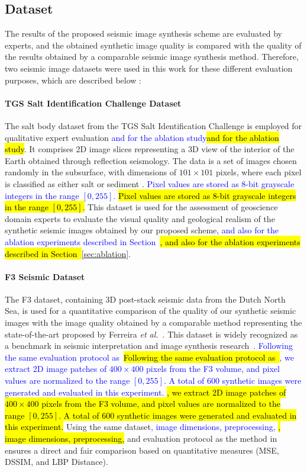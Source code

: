 \documentclass{ieeeaccess}
\providecommand{\DIFaddbegin}{} %
\providecommand{\DIFaddend}{} %
\newcommand{\DIFaddincludegraphics}[2][]{{\color{blue}\fbox{\DIFOincludegraphics[#1]{#2}}}} %
\DeclareRobustCommand{\DIFaddbegin}{\DIFOaddbegin \let\includegraphics\DIFaddincludegraphics} %
\DeclareRobustCommand{\DIFaddend}{\DIFOaddend \let\includegraphics\DIFOincludegraphics} %
\providecommand{\DIFadd}[1]{\ifmmode\textcolor{blue}{#1}\else\hl{#1}\fi}
\renewcommand{\DIFadd}[1]{\ifmmode\textcolor{blue}{#1}\else\hl{#1}\fi}
\begin{document}
\subsection{Dataset}

The results of the proposed seismic image synthesis scheme are evaluated by experts, and the obtained synthetic image quality is compared with the quality of the results obtained by a comparable seismic image synthesis method. Therefore, two seismic image datasets were used in this work for these different evaluation purposes, which are described below :

\paragraph{TGS Salt Identification Challenge Dataset}

The salt body dataset from the TGS Salt Identification Challenge is employed for qualitative expert evaluation \DIFaddbegin \DIFadd{and for the ablation study}\DIFaddend . It comprises 2D image slices representing a 3D view of the interior of the Earth obtained through reflection seismology. The data is a set of images chosen randomly in the subsurface, with dimensions of $101 \times 101$ pixels, where each pixel is classified as either salt or sediment \cite{TGS2023}. \DIFaddbegin \DIFadd{Pixel values are stored as 8-bit grayscale integers in the range $[0, 255]$. }\DIFaddend This dataset is used for the assessment of geoscience domain experts to evaluate the visual quality and geological realism of the synthetic seismic images obtained by our proposed scheme\DIFaddbegin \DIFadd{, and also for the ablation experiments described in Section~}\DIFaddend \ref{sec:ablation}.
\paragraph{F3 Seismic Dataset}

The F3 dataset, containing 3D post-stack seismic data from the Dutch North Sea, is used for a quantitative comparison of the quality of our synthetic seismic images with the image quality obtained by a comparable method representing the state-of-the-art proposed by Ferreira \emph{et al.}~\cite{Ferreira2020}. This dataset is widely recognized as a benchmark in seismic interpretation and image synthesis research~\cite{Baroni2018}. \DIFaddbegin \DIFadd{Following the same evaluation protocol as~}\cite{Ferreira2020}\DIFadd{, we extract 2D image patches of $400 \times 400$ pixels from the F3 volume, and pixel values are normalized to the range $[0, 255]$. A total of 600 synthetic images were generated and evaluated in this experiment. }\DIFaddend Using the same dataset\DIFaddbegin \DIFadd{, image dimensions, preprocessing, }\DIFaddend and evaluation protocol as the method in~\cite{Ferreira2020}  ensures a direct and fair comparison based on quantitative measures (MSE, DSSIM, and LBP Distance).
\end{document}
